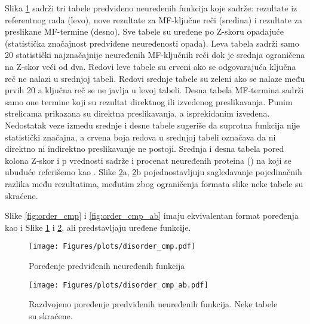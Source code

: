Slika \ref{fig:disorder_cmp} sadrži tri tabele predviđeno neuređenih funkcija
koje sadrže: rezultate iz referentnog rada (levo), nove
rezultate za MF-ključne reči (sredina) i rezultate za preslikane MF-termine
(desno). Sve tabele su uređene po Z-skoru opadajuće (statistička značajnost
predviđene neuređenosti opada).  Leva tabela sadrži samo 20 statistički
najznačajnije neuređenih MF-ključnih reči dok je srednja ograničena na Z-skor
veći od dva.  Redovi leve tabele su crveni ako se odgovarajuća ključna reč ne
nalazi u srednjoj tabeli.  Redovi srednje tabele su zeleni ako se nalaze među
prvih 20 a ključna reč se ne javlja u levoj tabeli.  Desna tabela MF-termina
sadrži samo one termine koji su rezultat direktnog ili izvedenog preslikavanja.
Punim strelicama prikazana su direktna preslikavanja, a isprekidanim izvedena.
Nedostatak veze između srednje i desne tabele sugeriše da suprotna funkcija
nije statistički značajna, a crvena boja redova u srednjoj tabeli označava da
ni direktno ni indirektno preslikavanje ne postoji.  Srednja i desna tabela pored
kolona Z-skor i p vrednosti sadrže i procenat neuređenih proteina
() na koji se ubuduće referišemo kao . Slike \ref{fig:disorder_cmp_ab}a, \ref{fig:disorder_cmp_ab}b
pojednostavljuju sagledavanje pojedinačnih razlika među rezultatima, međutim
zbog ograničenja formata slike neke tabele su skraćene.

Slike \ref{fig:order_cmp} i \ref{fig:order_cmp_ab}  imaju ekvivalentan format
poređenja kao i Slike \ref{fig:disorder_cmp} i \ref{fig:disorder_cmp_ab}, ali
predstavljaju uređene funkcije.



\clearpage

\begin{figure}[th]
\hspace*{-0.5cm} 
  \centering
\texttt{[image: Figures/plots/disorder\_cmp.pdf]}
\caption {
  Poređenje predviđenih neuređenih funkcija
}
\label{fig:disorder_cmp}
\end{figure}

\clearpage

\begin{figure}[th]
  \centering
\texttt{[image: Figures/plots/disorder\_cmp\_ab.pdf]}
\caption {
  Razdvojeno poređenje predviđenih neuređenih funkcija. Neke tabele su skraćene.
}
\label{fig:disorder_cmp_ab}
\end{figure}

